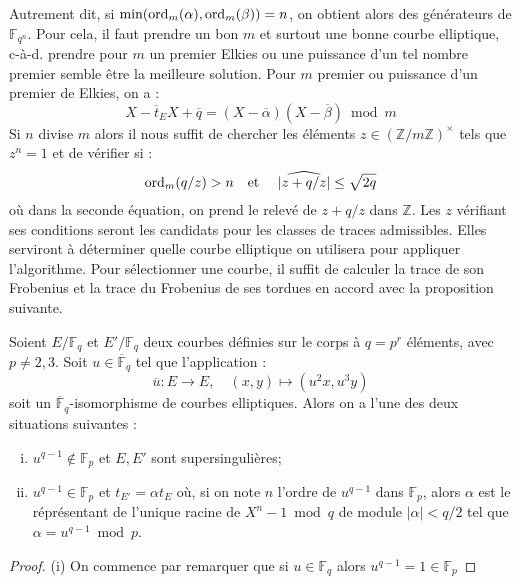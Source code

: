 \documentclass[a4paper]{article} %
\numberwithin{section}{part}
\numberwithin{equation}{section}
\newcommand\zmodninv[1]{(\mathbb{Z}/#1\mathbb{Z})^{\times}}
\newcommand\GF[1]{\mathbb{F}_{#1}}
\newcommand\ZZ{\mathbb{Z}}
\newcommand\etmath{\textup{\quad et \quad}}
\newcommand\ord[2]{\textup{ord}_{#1}(#2)}
\begin{document}
Autrement dit, si $\textup{min}(\ord{m}{\alpha},\ord{m}{\beta}) = n$, on obtient
alors des générateurs de $\GF{q^n}$. Pour cela, il faut prendre un bon $m$ et
surtout une bonne courbe elliptique, c-à-d. prendre pour $m$ un premier
Elkies ou une puissance d'un tel nombre premier semble être la meilleure
solution. Pour $m$ premier ou puissance d'un premier de Elkies, on a :
\begin{equation}
X - \overline{t}_EX + \overline{q} = (X - \overline{\alpha})(X -
\overline{\beta})\bmod m
\end{equation}
Si $n$ divise $m$ alors il nous suffit de chercher les éléments
$z\in\zmodninv{m}$ tels que $z^n = 1$ et de vérifier si :
\begin{equation}
\ord{m}{q/z} > n \etmath \vert{\widehat{z + q/z}}\vert\leq\sqrt{2q}
\end{equation}
où dans la seconde équation, on prend le relevé de $z + q/z$ dans $\ZZ$. Les $z$
vérifiant ses conditions seront les candidats pour les classes de traces
admissibles. Elles serviront à déterminer quelle courbe elliptique on utilisera
pour appliquer l'algorithme. Pour sélectionner une courbe, il suffit de calculer
la trace de son Frobenius et la trace du Frobenius de ses tordues en accord avec
la proposition suivante.
\begin{prop}
\label{prop:trtwist}
Soient $E/\GF{q}$ et $E'/\GF{q}$ deux courbes définies sur le corps à $q = p^r$
éléments, avec $p\neq2,3$. Soit $u\in\overline{\mathbb{F}}_q$ tel que 
l'application :
\begin{equation}
\overline{u} : E\longrightarrow E,\quad(x,y)\longmapsto(u^2x,u^3y)
\end{equation}
soit un $\overline{\mathbb{F}}_q$-isomorphisme de courbes elliptiques. Alors on 
a l'une des deux situations suivantes :
\begin{enumerate}[(i)]
    \item $u^{q-1}\notin\GF{p}$ et $E, E'$ sont supersingulières;
    \item $u^{q-1}\in\GF{p}$ et $t_{E'} = \alpha t_E$ où, si on note $n$ l'ordre
    de $u^{q-1}$ dans $\GF{p}$, alors $\alpha$ est le réprésentant de l'unique
    racine de $X^n - 1 \bmod q$ de module $\vert{\alpha}\vert < q/2$ tel que
    $\alpha = u^{q-1}\bmod p$.
\end{enumerate}
\end{prop}
\begin{proof}
(i) On commence par remarquer que si $u\in\GF{q}$ alors $u^{q-1} = 1\in\GF{p}$
\end{proof}
\end{document}
